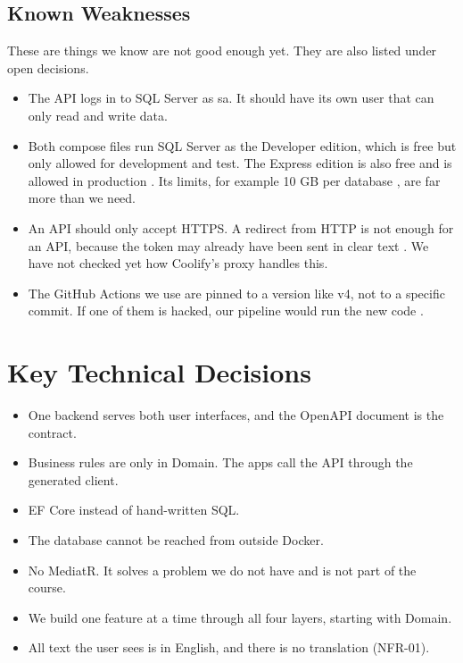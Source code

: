 \documentclass[a4paper,11pt]{article}
\begin{document}
\subsection{Known Weaknesses}
These are things we know are not good enough yet. They are also listed under open decisions.
\begin{itemize}
    \item The API logs in to SQL Server as sa. It should have its own user that can only read and write data.
    \item Both compose files run SQL Server as the Developer edition, which is free but only allowed for development and test. The Express edition is also free and is allowed in production \cite[sec.~4.2.2, p.~101]{desanctis-web-apis-aspnet-core}. Its limits, for example 10 GB per database \cite{microsoft-sql-server-2022-editions}, are far more than we need.
    \item An API should only accept HTTPS. A redirect from HTTP is not enough for an API, because the token may already have been sent in clear text \cite[sec.~HSTS and API projects]{microsoft-aspnetcore-enforce-https}. We have not checked yet how Coolify's proxy handles this.
    \item The GitHub Actions we use are pinned to a version like v4, not to a specific commit. If one of them is hacked, our pipeline would run the new code \cite[sec.~Using third-party actions]{github-secure-use}.
\end{itemize}

\section{Key Technical Decisions}
\begin{itemize}
    \item One backend serves both user interfaces, and the OpenAPI document is the contract.
    \item Business rules are only in Domain. The apps call the API through the generated client.
    \item EF Core instead of hand-written SQL.
    \item The database cannot be reached from outside Docker.
    \item No MediatR. It solves a problem we do not have and is not part of the course.
    \item We build one feature at a time through all four layers, starting with Domain.
    \item All text the user sees is in English, and there is no translation (NFR-01).
\end{itemize}
\end{document}
